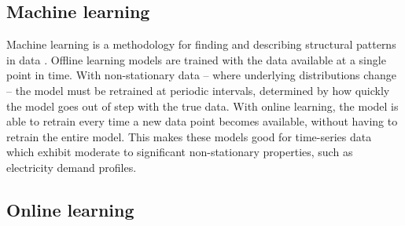 











\subsection{Machine learning}

Machine learning is a methodology for finding and describing structural patterns in data \cite{Witten2011}. Offline learning models are trained with the data available at a single point in time. With non-stationary data -- where underlying distributions change -- the model must be retrained at periodic intervals, determined by how quickly the model goes out of step with the true data. With online learning, the model is able to retrain every time a new data point becomes available, without having to retrain the entire model. This makes these models good for time-series data which exhibit moderate to significant non-stationary properties, such as electricity demand profiles.





\subsection{Online learning}




